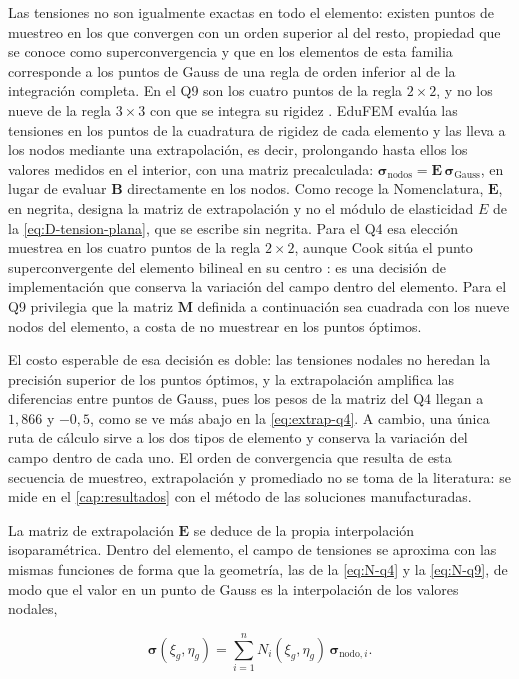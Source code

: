 Las tensiones no son igualmente exactas en todo el elemento: existen puntos de muestreo en los que convergen con un orden superior al del resto, propiedad que se conoce como superconvergencia y que en los elementos de esta familia corresponde a los puntos de Gauss de una regla de orden inferior al de la integración completa. En el Q9 son los cuatro puntos de la regla $2\times2$, y no los nueve de la regla $3\times3$ con que se integra su rigidez \autocite[pp.~230-231]{cook2002concepts}. EduFEM evalúa las tensiones en los puntos de la cuadratura de rigidez de cada elemento y las lleva a los nodos mediante una extrapolación, es decir, prolongando hasta ellos los valores medidos en el interior, con una matriz precalculada: $\bm{\sigma}_{\text{nodos}} = \bm{E}\,\bm{\sigma}_{\text{Gauss}}$, en lugar de evaluar $\bm{B}$ directamente en los nodos. Como recoge la Nomenclatura, $\bm{E}$, en negrita, designa la matriz de extrapolación y no el módulo de elasticidad $E$ de la \autoref{eq:D-tension-plana}, que se escribe sin negrita. Para el Q4 esa elección muestrea en los cuatro puntos de la regla $2\times2$, aunque Cook sitúa el punto superconvergente del elemento bilineal en su centro \autocite[p.~230]{cook2002concepts}: es una decisión de implementación que conserva la variación del campo dentro del elemento. Para el Q9 privilegia que la matriz $\bm{M}$ definida a continuación sea cuadrada con los nueve nodos del elemento, a costa de no muestrear en los puntos óptimos.

El costo esperable de esa decisión es doble: las tensiones nodales no heredan la precisión superior de los puntos óptimos, y la extrapolación amplifica las diferencias entre puntos de Gauss, pues los pesos de la matriz del Q4 llegan a $1{,}866$ y $-0{,}5$, como se ve más abajo en la \autoref{eq:extrap-q4}. A cambio, una única ruta de cálculo sirve a los dos tipos de elemento y conserva la variación del campo dentro de cada uno. El orden de convergencia que resulta de esta secuencia de muestreo, extrapolación y promediado no se toma de la literatura: se mide en el \autoref{cap:resultados} con el método de las soluciones manufacturadas.

La matriz de extrapolación $\bm{E}$ se deduce de la propia interpolación isoparamétrica. Dentro del elemento, el campo de tensiones se aproxima con las mismas funciones de forma que la geometría, las de la \autoref{eq:N-q4} y la \autoref{eq:N-q9}, de modo que el valor en un punto de Gauss es la interpolación de los valores nodales,

\begin{equation}
\bm{\sigma}(\xi_g,\eta_g) = \sum_{i=1}^{n} N_i(\xi_g,\eta_g)\,\bm{\sigma}_{\text{nodo},i}.
\label{eq:interp-tension}
\end{equation}

